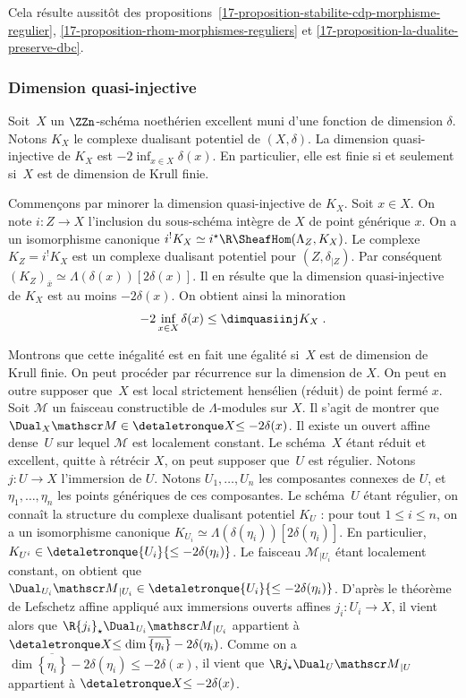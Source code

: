 \documentclass[10pt]{../fichiers-configuration-latex/smfart}
\begin{document}
Cela résulte aussitôt des
propositions~\ref{17-proposition-stabilite-cdp-morphisme-regulier},
\ref{17-proposition-rhom-morphismes-reguliers} et
\ref{17-proposition-la-dualite-preserve-dbc}.

\subsubsection{Dimension quasi-injective}%

\begin{proposition3}\label{17-proposition-dimension-quasi-injective}
Soit $X$ un $\ZZn$-schéma noethérien excellent muni d'une fonction de
dimension $\delta$. Notons $K_X$ le complexe dualisant potentiel de
$(X,\delta)$. La dimension quasi-injective de $K_X$ est $-2\inf_{x\in
X}\delta(x)$. En particulier, elle est finie si et seulement si $X$ est de
dimension de Krull finie.
\end{proposition3}

Commençons par minorer la dimension quasi-injective de $K_X$. Soit $x\in
X$. On note $i\colon Z\to X$ l'inclusion du sous-schéma intègre de 
$X$ de point générique $x$. On a un isomorphisme canonique 
$i^!K_X\simeq i^\star \R\SheafHom(\Lambda_Z,K_X)$. Le complexe
$K_Z=i^!K_X$ est un complexe dualisant potentiel pour $(Z,\delta_{|Z})$. Par
conséquent $(K_Z)_{\overline x}\simeq \Lambda(\delta(x))[2\delta(x)]$. Il
en résulte que la dimension quasi-injective de $K_X$ est au moins
$-2\delta(x)$. On obtient ainsi la minoration
\[-2\inf_{x\in X}\delta(x)\leq \dimquasiinj K_X\;\text{.}\]

Montrons que cette inégalité est en fait une égalité si $X$ est de
dimension de Krull finie. On peut procéder par récurrence sur la dimension
de $X$. On peut en outre supposer que $X$ est local strictement
hensélien (réduit) de point fermé $x$.
Soit $\mathscr M$ un faisceau constructible de
$\Lambda$-modules sur $X$. Il s'agit de montrer que $\Dual_X\mathscr
M\in\detaletronque X {\leq -2\delta(x)}$.
Il existe un ouvert affine dense $U$ sur lequel
$\mathscr M$ est localement constant. Le schéma $X$ étant réduit et
excellent, quitte à rétrécir $X$, 
on peut supposer que $U$ est régulier. Notons $j\colon U\to X$ l'immersion
de $U$. Notons
$U_1,\dots,U_n$ les composantes connexes de $U$, et $\eta_1,\dots,\eta_n$
les points génériques de ces composantes. Le schéma $U$ étant régulier, on
connaît la structure du complexe dualisant potentiel
$K_U$ : pour tout $1\leq i\leq n$, on a un
isomorphisme canonique $K_{U_i}\simeq
\Lambda(\delta(\eta_i))[2\delta(\eta_i)]$. En particulier,
$K_{U^i}\in\detaletronque {U_i}{\leq -2\delta(\eta_i)}$. Le faisceau ${\mathscr
M}_{|U_i}$ étant localement constant, on obtient que $\Dual_{U_i}{\mathscr
M}_{|U_i}\in\detaletronque {U_i}{\leq -2\delta(\eta_i)}$. D'après le théorème de
Lefschetz affine appliqué aux immersions ouverts affines
$j_i\colon U_i\to X$, il
vient alors que $\R {j_i}_\star \Dual_{U_i}{\mathscr
M}_{|U_i}$ appartient à $\detaletronque X {\leq \dim
\overline{\left\{\eta_i\right\}}-2\delta(\eta_i)}$. Comme on a  
$\dim \overline{\left\{\eta_i\right\}}-2\delta(\eta_i)\leq -2\delta(x)$,
il vient que $\R j_\star \Dual_U{\mathscr M}_{|U}$ appartient à 
$\detaletronque X {\leq -2\delta(x)}$.
\end{document}
